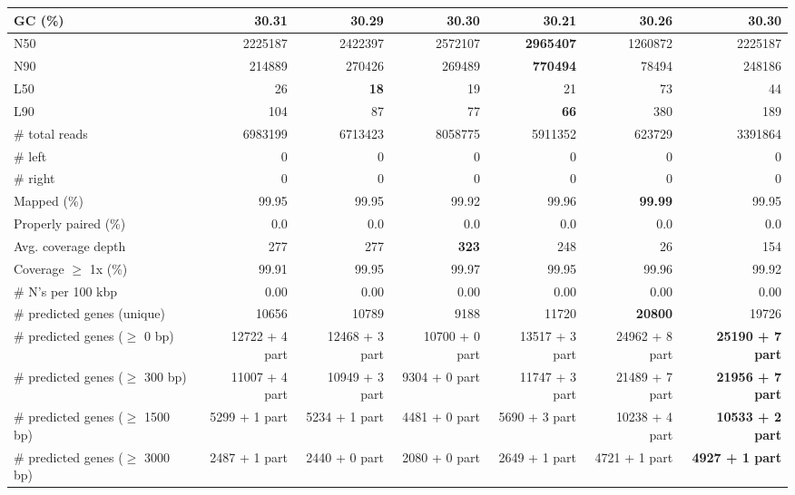 \documentclass[12pt,a4paper]{article}
\begin{document}
\begin{table}[ht]
\begin{center}
\begin{tabular}{|l*{6}{|r}|}
GC (\%) & 30.31 & 30.29 & 30.30 & 30.21 & 30.26 & 30.30 \\ \hline
N50 & 2225187 & 2422397 & 2572107 & {\bf 2965407} & 1260872 & 2225187 \\ \hline
N90 & 214889 & 270426 & 269489 & {\bf 770494} & 78494 & 248186 \\ \hline
L50 & 26 & {\bf 18} & 19 & 21 & 73 & 44 \\ \hline
L90 & 104 & 87 & 77 & {\bf 66} & 380 & 189 \\ \hline
\# total reads & 6983199 & 6713423 & 8058775 & 5911352 & 623729 & 3391864 \\ \hline
\# left & 0 & 0 & 0 & 0 & 0 & 0 \\ \hline
\# right & 0 & 0 & 0 & 0 & 0 & 0 \\ \hline
Mapped (\%) & 99.95 & 99.95 & 99.92 & 99.96 & {\bf 99.99} & 99.95 \\ \hline
Properly paired (\%) & 0.0 & 0.0 & 0.0 & 0.0 & 0.0 & 0.0 \\ \hline
Avg. coverage depth & 277 & 277 & {\bf 323} & 248 & 26 & 154 \\ \hline
Coverage $\geq$ 1x (\%) & 99.91 & 99.95 & 99.97 & 99.95 & 99.96 & 99.92 \\ \hline
\# N's per 100 kbp & 0.00 & 0.00 & 0.00 & 0.00 & 0.00 & 0.00 \\ \hline
\# predicted genes (unique) & 10656 & 10789 & 9188 & 11720 & {\bf 20800} & 19726 \\ \hline
\# predicted genes ($\geq$ 0 bp) & 12722 + 4 part & 12468 + 3 part & 10700 + 0 part & 13517 + 3 part & 24962 + 8 part & {\bf 25190 + 7 part} \\ \hline
\# predicted genes ($\geq$ 300 bp) & 11007 + 4 part & 10949 + 3 part & 9304 + 0 part & 11747 + 3 part & 21489 + 7 part & {\bf 21956 + 7 part} \\ \hline
\# predicted genes ($\geq$ 1500 bp) & 5299 + 1 part & 5234 + 1 part & 4481 + 0 part & 5690 + 3 part & 10238 + 4 part & {\bf 10533 + 2 part} \\ \hline
\# predicted genes ($\geq$ 3000 bp) & 2487 + 1 part & 2440 + 0 part & 2080 + 0 part & 2649 + 1 part & 4721 + 1 part & {\bf 4927 + 1 part} \\ \hline
\end{tabular}
\end{center}
\end{table}
\end{document}
